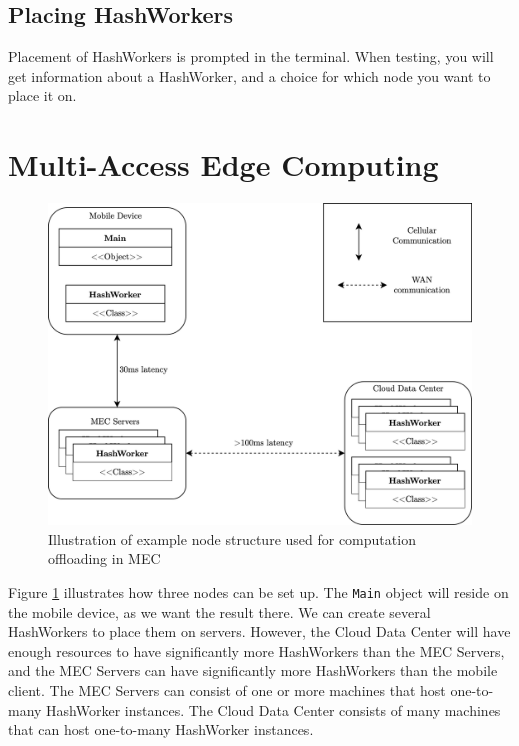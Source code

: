 \subsection{Placing HashWorkers}
Placement of HashWorkers is prompted in the terminal. When testing, you will get information about a HashWorker, and a choice for which node you want to place it on. 















\section{Multi-Access Edge Computing}

\begin{figure}[t]
    \centering
    \includegraphics[scale=1]{chapters/5_implementation/figures/MEC_implementation.png}
    \caption{Illustration of example node structure used for computation offloading in MEC}
    \label{fig:MEC_implementation}
\end{figure}
Figure \ref{fig:MEC_implementation} illustrates how three nodes can be set up. The \verb|Main| object will reside on the mobile device, as we want the result there. We can create several HashWorkers to place them on servers. However, the Cloud Data Center will have enough resources to have significantly more HashWorkers than the MEC Servers, and the MEC Servers can have significantly more HashWorkers than the mobile client. The MEC Servers can consist of one or more machines that host one-to-many HashWorker instances. The Cloud Data Center consists of many machines that can host one-to-many HashWorker instances.




